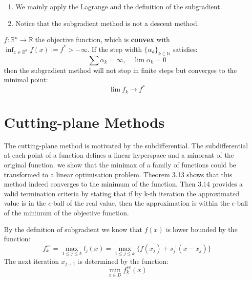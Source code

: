 \begin{remark}\quad
	\begin{enumerate}
		\item We mainly apply the Lagrange and the definition of the subgradient.
		\item Notice that the subgradient method is not a descent method.
	\end{enumerate}
\end{remark}


\begin{theorem}
	$f : \mathbb{R}^n \longrightarrow \mathbb{R}$ the objective function, which is \textbf{convex} with $\inf_{x \in \mathbb{R}^n} f(x) := f^* > - \infty$. If the step width $\{\alpha_k \}_{k \in \mathbb{N}}$ satisfies:
	\begin{equation*}
		\sum \alpha_k = \infty, \quad \lim \alpha_k = 0
	\end{equation*}
	then the subgradient method will not stop in finite steps but converges to the minimal point:
	\begin{equation*}
		\lim f_k \longrightarrow f^*
	\end{equation*}
\end{theorem}





\section{Cutting-plane Methods}
The cutting-plane method is motivated by the subdifferential. The subdifferential at each point of a function defines a linear hyperspace and a minorant of the original function. we show that the minimax of a family of functions could be transformed to a linear optimisation problem. Theorem 3.13 shows that this method indeed converges to the minimum of the function. Then 3.14 provides a valid termination criteria by stating that if by k-th iteration the approximated value is in the $\epsilon$-ball of the real value, then the approximation is within the $\epsilon$-ball of the minimum of the objective function.

By the definition of subgradient we know that $f(x)$ is lower bounded by the function:
\begin{equation} 
	f^{se}_k = \max_{1 \leq j \leq k} l_j(x) = \max_{1 \leq j \leq k} \{f(x_j) + s_j^\top (x - x_j)\}
\end{equation} 
The next iteration $x_{j + 1}$ is determined by the function:
\begin{equation*}
	\min_{x \in D} f_k^{se} (x)
\end{equation*}

